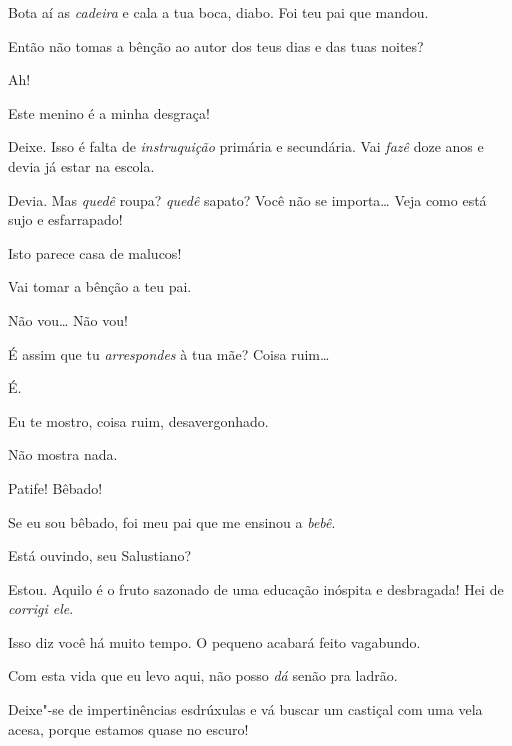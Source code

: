 \begin{linenumbers}
 Bota aí as
\textit{cadeira} e cala a tua boca, diabo. Foi teu
pai que mandou.

  
Então não tomas a bênção ao autor dos teus
dias e das tuas noites?

  
Ah! 

 Este menino
é a minha desgraça!

 Deixe. Isso
é falta de \textit{instruquição} primária e
secundária. Vai \textit{fazê} doze anos e devia já
estar na escola.

 Devia. Mas
\textit{quedê} roupa? \textit{quedê}
sapato? Você não se importa\ldots{} 
 Veja como está sujo e
esfarrapado!

 Isto parece casa de
malucos!

 Vai tomar a
bênção a teu pai.

 Não vou\ldots{} Não vou!

 É assim que tu
\textit{arrespondes} à tua mãe?
Coisa ruim\ldots{}

 É.

  Eu te mostro, coisa ruim,
desavergonhado.

  Não mostra
nada.

 Patife! Bêbado!

 Se eu sou
bêbado, foi meu pai que me ensinou a
\textit{bebê}. 

 Está ouvindo,
seu Salustiano?

 Estou. Aquilo
é o fruto sazonado de uma educação inóspita
e desbragada! Hei de \textit{corrigi ele}.

 Isso diz
você há muito tempo. O pequeno acabará
feito vagabundo.

  Com esta vida que
eu levo aqui, não posso \textit{dá} senão
pra ladrão.

 Deixe"-se de
impertinências esdrúxulas e vá buscar um
castiçal com uma vela acesa, porque estamos quase no
escuro!


\end{linenumbers}
